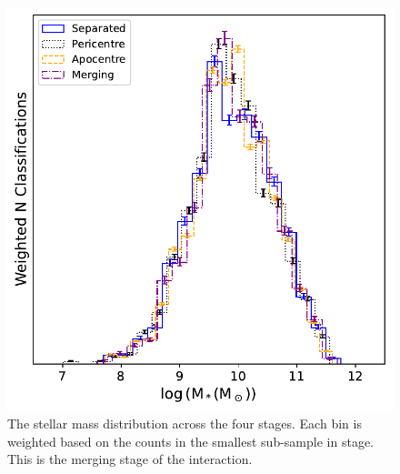 \begin{figure}
    \centering
    \includegraphics[width = \textwidth]{Chapter3/figures/stellar-mass-dist.pdf}
    \caption[The stellar mass distribution across the four stages.]{The stellar mass distribution across the four stages. Each bin is weighted based on the counts in the smallest sub-sample in stage. This is the merging stage of the interaction.}
    \label{fig:weighted-mass}
\end{figure}

